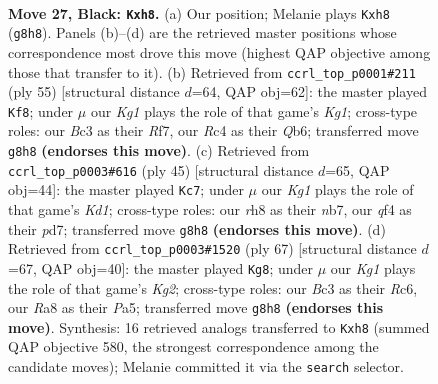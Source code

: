 \documentclass[11pt]{article}
\begin{document}
\clearpage

\begin{figure}[p]\centering
\begin{subfigure}{0.46\textwidth}\centering
\resizebox{\linewidth}{!}{%
\newchessgame
\chessboard[
  setfen={r5kR/p7/4p1p1/pq1p4/2rP1QP1/2b5/2P5/3K2R1 b - - 1 27},
  showmover=false,
  pgfstyle=straightmove, color=movearrow, markmove={g8-h8}
]}
\caption{}
\end{subfigure}\hfill
\begin{subfigure}{0.46\textwidth}\centering
\resizebox{\linewidth}{!}{%
\newchessgame
\chessboard[
  setfen={4r1k1/3p1r2/pq2pPQ1/8/2pP4/2P3P1/P6P/5RK1 b - - 0 28},
  showmover=false,
  pgfstyle=straightmove, color=movearrow, markmove={g8-f8}
]}
\caption{}
\end{subfigure}
\\[4pt]
\begin{subfigure}{0.46\textwidth}\centering
\resizebox{\linewidth}{!}{%
\newchessgame
\chessboard[
  setfen={r2k1b2/pN1P1p2/4p3/3p3q/Q4p2/8/PPP2P2/R4K2 b - - 0 23},
  showmover=false,
  pgfstyle=straightmove, color=movearrow, markmove={d8-c7}
]}
\caption{}
\end{subfigure}\hfill
\begin{subfigure}{0.46\textwidth}\centering
\resizebox{\linewidth}{!}{%
\newchessgame
\chessboard[
  setfen={8/5pk1/2r4p/p1Pqp1p1/8/P5PP/2R2P2/2Q3K1 b - - 1 34},
  showmover=false,
  pgfstyle=straightmove, color=movearrow, markmove={g7-g8}
]}
\caption{}
\end{subfigure}
\caption{\textbf{Move 27, Black: \texttt{Kxh8}.} (a) Our position; Melanie plays \texttt{Kxh8} (\texttt{g8h8}). Panels (b)--(d) are the retrieved master positions whose correspondence most drove this move (highest QAP objective among those that transfer to it). (b) Retrieved from \texttt{ccrl\_top\_p0001\#211} (ply 55) [structural distance $d$=64, QAP obj=62]: the master played \texttt{Kf8}; under $\mu$ our \emph{Kg1} plays the role of that game's \emph{Kg1}; cross-type roles: our \emph{B}c3 as their \emph{R}f7, our \emph{R}c4 as their \emph{Q}b6; transferred move \texttt{g8h8} \textbf{(endorses this move)}. (c) Retrieved from \texttt{ccrl\_top\_p0003\#616} (ply 45) [structural distance $d$=65, QAP obj=44]: the master played \texttt{Kc7}; under $\mu$ our \emph{Kg1} plays the role of that game's \emph{Kd1}; cross-type roles: our \emph{r}h8 as their \emph{n}b7, our \emph{q}f4 as their \emph{p}d7; transferred move \texttt{g8h8} \textbf{(endorses this move)}. (d) Retrieved from \texttt{ccrl\_top\_p0003\#1520} (ply 67) [structural distance $d$=67, QAP obj=40]: the master played \texttt{Kg8}; under $\mu$ our \emph{Kg1} plays the role of that game's \emph{Kg2}; cross-type roles: our \emph{B}c3 as their \emph{R}c6, our \emph{R}a8 as their \emph{P}a5; transferred move \texttt{g8h8} \textbf{(endorses this move)}. Synthesis: 16 retrieved analogs transferred to \texttt{Kxh8} (summed QAP objective 580, the strongest correspondence among the candidate moves); Melanie committed it via the \texttt{search} selector.}
\label{fig:thought-m53}
\end{figure}
\end{document}
